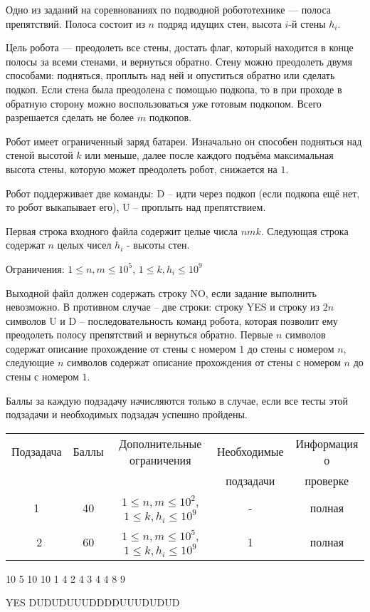 
Одно из заданий на соревнованиях по подводной робототехнике — полоса препятствий. Полоса состоит из $n$ подряд идущих стен, высота $i$-й стены $h_i$. 

Цель робота — преодолеть все стены, достать флаг, который находится в конце полосы за всеми стенами, и вернуться обратно. Стену можно преодолеть двумя способами: подняться, проплыть над ней и опуститься обратно или сделать подкоп. Если стена была преодолена с помощью подкопа, то в при проходе в обратную сторону можно воспользоваться уже готовым подкопом. Всего разрешается сделать не более $m$ подкопов.

Робот имеет ограниченный заряд батареи. Изначально он способен подняться над стеной высотой $k$ или меньше, далее после каждого подъёма максимальная высота стены, которую может преодолеть робот, снижается на $1$. 

Робот поддерживает две команды: D -- идти через подкоп (если подкопа ещё нет, то робот выкапывает его), U -- проплыть над препятствием.


Первая строка входного файла содержит целые числа $n m k$.
Следующая строка содержат $n$ целых чисел $h_i$ - высоты стен.

Ограничения:
$1 \le n, m \le 10^5$, $1 \le k, h_i \le 10^9$

\outputfmtSection

Выходной файл должен содержать строку NO, если задание выполнить невозможно. В противном случае -- две строки: строку YES и строку из $2n$ символов U и D -- последовательность команд робота, которая позволит ему преодолеть полосу препятствий и вернуться обратно. Первые $n$ символов содержат описание прохождение от стены с номером $1$ до стены с номером $n$, следующие $n$ символов содержат описание прохождения от стены с номером $n$ до стены с номером $1$.

\markSection

Баллы за каждую подзадачу начисляются только в случае, если все тесты этой
подзадачи и необходимых подзадач успешно пройдены.

\begin{table}[h]
    \small
\begin{tabular}{|c|c|c|c|c|}
Подзадача&Баллы&Дополнительные ограничения&Необходимые &Информация о  \\
         &     &                          &подзадачи   &проверке\\
         \hline
1&40&$1 \le n, m \le 10^2$, $1 \le k, h_i \le 10^9$&-&полная\\\
2&60&$1 \le n, m \le 10^5$, $1 \le k, h_i \le 10^9$&1&полная
\end{tabular}
\end{table}


\begin{myverbbox}[\small]{\vinput}
    10 5 10
    10 1 4 2 4 3 4 4 8 9
\end{myverbbox}
\begin{myverbbox}[\small]{\voutput}
    YES
    DUDUDUUUDDDDUUUDUDUD
\end{myverbbox}

